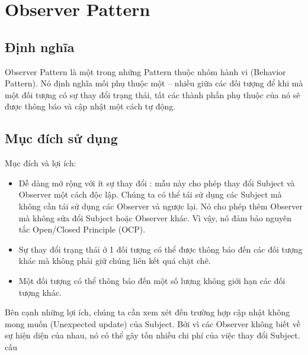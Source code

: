 \chapter{Observer Pattern}

\section{Định nghĩa}
Observer Pattern là một trong những Pattern thuộc nhóm hành vi (Behavior Pattern). Nó định nghĩa mối phụ thuộc một – nhiều giữa các đối tượng để khi mà một đối tượng có sự thay đổi trạng thái, tất các thành phần phụ thuộc của nó sẽ được thông báo và cập nhật một cách tự động.

\section{Mục đích sử dụng}
Mục đích và lợi ích:
\begin{itemize}
	\item	Dễ dàng mở rộng với ít sự thay đổi : mẫu này cho phép thay đổi Subject và Observer một cách độc lập. Chúng ta có thể tái sử dụng các Subject mà không cần tái sử dụng các Observer và ngược lại. Nó cho phép thêm Observer mà không sửa đổi Subject hoặc Observer khác. Vì vậy, nó đảm bảo nguyên tắc Open/Closed Principle (OCP).\\
	\item	Sự thay đổi trạng thái ở 1 đối tượng có thể được thông báo đến các đối tượng khác mà không phải giữ chúng liên kết quá chặt chẽ.\\
	\item	Một đối tượng có thể thông báo đến một số lượng không giới hạn các đối tượng khác.
\end{itemize}
Bên cạnh những lợi ích, chúng ta cần xem xét đến trường hợp cập nhật không mong muốn (Unexpected update) của Subject. Bởi vì các Observer không biết về sự hiện diện của nhau, nó có thể gây tốn nhiều chi phí của việc thay đổi Subject.
cấu
